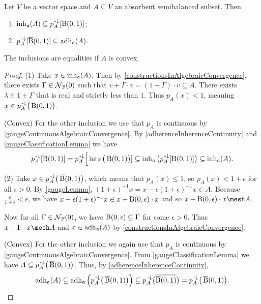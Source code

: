 \begin{proposition} \label{gaugeInherenceAdherence}
Let $V$ be a vector space and $A\subseteq V$ an absorbent semibalanced subset. Then
\begin{enumerate}
\item $\operatorname{inh}_\mathfrak{a}(A) \subseteq p_A^{{\text{\hspace{0.15em}-}\downarrow}}[\operatorname{B}(0,1)]$;
\item $p_A^{{\text{\hspace{0.15em}-}\downarrow}}[\operatorname{\overline{B}}(0,1)] \subseteq \operatorname{adh}_\mathfrak{a}(A)$.
\end{enumerate}
The inclusions are equalities if $A$ is convex.
\end{proposition}
\begin{proof}
(1) Take $x\in \operatorname{inh}_\mathfrak{a}(A)$. Then by \ref{constructionsInAlgebraicConvergence}, there exists $\Gamma\in\operatorname{\mathcal{N}}_{\mathbb{F}}(0)$ such that $v+\Gamma\cdot v = (1 + \Gamma)\cdot v \subseteq A$. There exists $\lambda \in 1 + \Gamma$ that is real and strictly less than $1$. Thus $p_A(x) <1$, meaning $x\in p^{\text{\hspace{0.15em}-}\downarrow}_A\big(\operatorname{B}(0,1)\big)$.

(Convex) For the other inclusion we use that $p_A$ is continuous by \ref{gaugeContinuousAlgebraicConvergence}. By \ref{adherenceInherenceContinuity} and \ref{gaugeClassificationLemma} we have
\[ p_A^{{\text{\hspace{0.15em}-}\downarrow}}[\operatorname{B}(0,1)] = p_A^{{\text{\hspace{0.15em}-}\downarrow}}\Big[\operatorname{int}_{\mathbb{F}}\big(\operatorname{B}(0,1)\big)] \subseteq \operatorname{inh}_\mathfrak{a}\big(p_A^{{\text{\hspace{0.15em}-}\downarrow}}[\operatorname{B}(0,1)]\big) \subseteq \operatorname{inh}_\mathfrak{a}(A). \]

(2) Take $x\in p^{\text{\hspace{0.15em}-}\downarrow}_A\big(\operatorname{\overline{B}}(0,1)\big)$, which means that $p_A(x) \leq 1$, so $p_A(x) < 1+\epsilon$ for all $\epsilon > 0$. By \ref{gaugeLemma}, $(1+\epsilon)^{-1}x = x - \epsilon(1+\epsilon)^{-1}x \in A$. Because $\frac{\epsilon}{1+\epsilon} < \epsilon$, we have $x - \epsilon(1+\epsilon)^{-1}x \in x + \operatorname{B}(0,\epsilon)\cdot x$ and so $x + \ball(0,\epsilon)\cdot x \mesh A$.

Now for all $\Gamma\in\operatorname{\mathcal{N}}_{\mathbb{F}}(0)$, we have $\operatorname{B}(0,\epsilon) \subseteq \Gamma$ for some $\epsilon >0$. Thus $x+ \Gamma\cdot x \mesh A$ and $x\in\operatorname{adh}_\mathfrak{a}(A)$ by \ref{constructionsInAlgebraicConvergence}.

(Convex) For the other inclusion we again use that $p_A$ is continuous by \ref{gaugeContinuousAlgebraicConvergence}. From \ref{gaugeClassificationLemma} we have $A \subseteq p^{\text{\hspace{0.15em}-}\downarrow}_A\big(\operatorname{\overline{B}}(0,1)\big)$. Thus, by \ref{adherenceInherenceContinuity},
\[ \operatorname{adh}_\mathfrak{a}(A) \subseteq \operatorname{adh}_\mathfrak{a}\Big(p^{\text{\hspace{0.15em}-}\downarrow}_A\big(\operatorname{\overline{B}}(0,1)\big)\Big) \subseteq p_A^{\text{\hspace{0.15em}-}\downarrow}\big(\overline{\operatorname{\overline{B}}(0,1)}\big) = p^{\text{\hspace{0.15em}-}\downarrow}_A\big(\operatorname{\overline{B}}(0,1)\big). \]
\end{proof}

